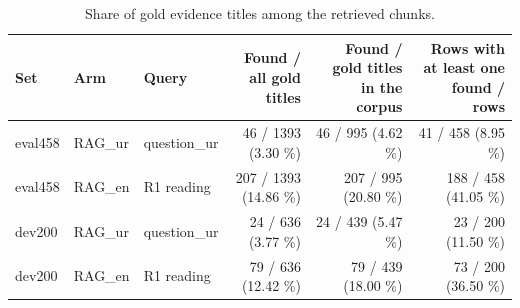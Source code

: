\begin{table}[t]
\centering
\small
\caption{Share of gold evidence titles among the retrieved chunks.}
\label{tab:d13-rag-titles}
\begin{tabular}{lllrrr}
\toprule
Set & Arm & Query & Found / all gold titles & Found / gold titles in the corpus & Rows with at least one found / rows \\
\midrule
eval458 & RAG\_ur & question\_ur & 46 / 1393 (3.30 \%) & 46 / 995 (4.62 \%) & 41 / 458 (8.95 \%) \\
eval458 & RAG\_en & R1 reading & 207 / 1393 (14.86 \%) & 207 / 995 (20.80 \%) & 188 / 458 (41.05 \%) \\
dev200 & RAG\_ur & question\_ur & 24 / 636 (3.77 \%) & 24 / 439 (5.47 \%) & 23 / 200 (11.50 \%) \\
dev200 & RAG\_en & R1 reading & 79 / 636 (12.42 \%) & 79 / 439 (18.00 \%) & 73 / 200 (36.50 \%) \\
\bottomrule
\end{tabular}
\end{table}
